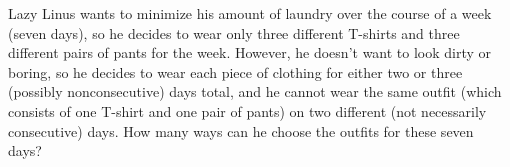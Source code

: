 Lazy Linus wants to minimize his amount of laundry over the course of a week (seven days), so he decides to wear only three different T-shirts and three different pairs of pants for the week. However, he doesn't want to look dirty or boring, so he decides to wear each piece of clothing for either two or three (possibly nonconsecutive) days total, and he cannot wear the same outfit (which consists of one T-shirt and one pair of pants) on two different (not necessarily consecutive) days. How many ways can he choose the outfits for these seven days?
